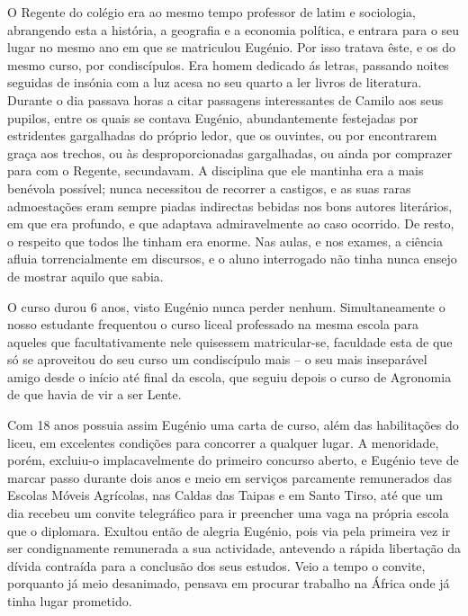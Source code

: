 \documentclass[9pt]{article}
\begin{document}
O Regente do colégio era ao mesmo tempo professor de latim e sociologia, abrangendo esta a his\-tó\-ria, a geografia e a economia política, e entrara para o seu lugar no mesmo ano em que se matriculou Eugé\-nio. Por
isso tratava êste, e os do mesmo curso, por condiscípulos. Era homem dedicado ás letras, passando noites seguidas de insónia com a luz acesa no
seu quarto a ler livros de literatura. Durante o dia passava horas a citar passagens interessantes de Camilo aos seus pupilos, entre os quais
se contava Eugé\-nio, abundantemente festejadas por estridentes garga\-lhadas
do próprio ledor, que os ouvintes, ou por encontrarem graça aos trechos,
ou às desproporcionadas garga\-lhadas, ou ainda por comprazer para com o
Regente, secundavam. A disciplina que ele mantinha era a mais benévola
possível; nunca necessitou de recorrer a castigos, e as suas raras admoesta\-ções eram sempre piadas indirectas bebidas nos bons autores literários,
em que era profundo, e que ada\-ptava admiravelmente ao caso ocorrido. De
resto, o respeito que todos lhe tinham era enorme. Nas aulas, e nos exames,
a ciência afluia torrencialmente em discursos, e o aluno interrogado não
tinha nunca ensejo de mostrar aquilo que sabia.

O curso durou 6 anos, visto Eugé\-nio nunca perder nenhum. Simultaneamente o nosso estudante frequentou o curso liceal professado na mesma
escola para aqueles que facultativamente nele quisessem ma\-tri\-cu\-lar-se,
faculdade esta de que só se aproveitou do seu curso um condiscípulo mais
-- o seu mais inseparável amigo desde o início até final da escola, que
seguiu depois o curso de Agronomia de que havia de vir a ser Lente.

Com 18 anos possuia assim Eugé\-nio uma carta de curso, além das habilita\-ções do liceu, em excelentes condi\-ções para concorrer a qualquer lugar. A menoridade, porém, excluiu-o implacavelmente do primeiro concurso
aberto, e Eugé\-nio teve de marcar passo durante dois anos e meio em serviços parcamente remunerados das Escolas Móveis Agrícolas, nas Caldas das
Taipas e em Santo Tirso, até que um dia recebeu um convite telegráfico
para ir preencher uma vaga na própria escola que o diplomara. Exultou
então de alegria Eugé\-nio, pois via pela primeira vez ir ser condignamente
remunerada a sua actividade, antevendo a rápida liberta\-ção da dívida contraída para a conclusão dos seus estudos. Veio a tempo o convite, porquanto
já meio desanimado, pensava em procurar traba\-lho na África onde já tinha lugar prometido.
\end{document}
